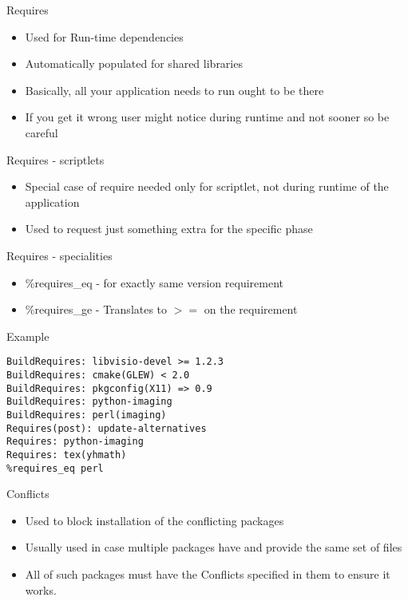 \documentclass{beamer}
\begin{document}
\begin{frame}[t]{Requires}
	\begin{itemize}
    \item Used for Run-time dependencies
    \item Automatically populated for shared libraries
    \item Basically, all your application needs to run ought to be there
    \item If you get it wrong user might notice during runtime and not sooner so be careful
	\end{itemize}
\end{frame}

\begin{frame}[t]{Requires - scriptlets}
	\begin{itemize}
	\item Special case of require needed only for scriptlet, not during runtime of the application
    \item Used to request just something extra for the specific phase
	\end{itemize}
\end{frame}

\begin{frame}[t]{Requires - specialities}
	\begin{itemize}
    \item \%requires\_eq - for exactly same version requirement
    \item  \%requires\_ge - Translates to $>=$ on the requirement
	\end{itemize}
\end{frame}

\begin{frame}[fragile]{Example}
	\begin{small}
	\begin{verbatim}
BuildRequires: libvisio-devel >= 1.2.3
BuildRequires: cmake(GLEW) < 2.0
BuildRequires: pkgconfig(X11) => 0.9
BuildRequires: python-imaging
BuildRequires: perl(imaging)
Requires(post): update-alternatives
Requires: python-imaging
Requires: tex(yhmath)
%requires_eq perl
	\end{verbatim}
	\end{small}
\end{frame}

\begin{frame}[t]{Conflicts}
	\begin{itemize}
    \item Used to block installation of the conflicting packages
    \item Usually used in case multiple packages have and provide the same set of files
    \item All of such packages must have the Conflicts specified in them to ensure it works.
	\end{itemize}
\end{frame}
\end{document}
